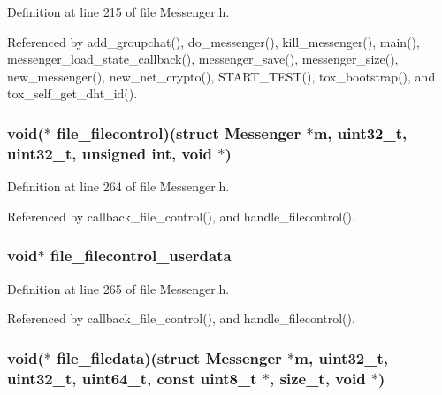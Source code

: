 Definition at line 215 of file Messenger.\+h.



Referenced by add\+\_\+groupchat(), do\+\_\+messenger(), kill\+\_\+messenger(), main(), messenger\+\_\+load\+\_\+state\+\_\+callback(), messenger\+\_\+save(), messenger\+\_\+size(), new\+\_\+messenger(), new\+\_\+net\+\_\+crypto(), S\+T\+A\+R\+T\+\_\+\+T\+E\+S\+T(), tox\+\_\+bootstrap(), and tox\+\_\+self\+\_\+get\+\_\+dht\+\_\+id().

\hypertarget{struct_messenger_a1e3990148af844c986e09a946650f7f3}{
\subsubsection[{file\+\_\+filecontrol}]{\setlength{\rightskip}{0pt plus 5cm}void($\ast$ file\+\_\+filecontrol)(struct {\bf Messenger} $\ast${\bf m}, uint32\+\_\+t, uint32\+\_\+t, unsigned int, void $\ast$)}}\label{struct_messenger_a1e3990148af844c986e09a946650f7f3}


Definition at line 264 of file Messenger.\+h.



Referenced by callback\+\_\+file\+\_\+control(), and handle\+\_\+filecontrol().

\hypertarget{struct_messenger_a34ba46a8cf11b02a23f7a7d219608c3b}{
\subsubsection[{file\+\_\+filecontrol\+\_\+userdata}]{\setlength{\rightskip}{0pt plus 5cm}void$\ast$ file\+\_\+filecontrol\+\_\+userdata}}\label{struct_messenger_a34ba46a8cf11b02a23f7a7d219608c3b}


Definition at line 265 of file Messenger.\+h.



Referenced by callback\+\_\+file\+\_\+control(), and handle\+\_\+filecontrol().

\hypertarget{struct_messenger_a2f2875b7bf0dda7ed90908d4e1139493}{
\subsubsection[{file\+\_\+filedata}]{\setlength{\rightskip}{0pt plus 5cm}void($\ast$ file\+\_\+filedata)(struct {\bf Messenger} $\ast${\bf m}, uint32\+\_\+t, uint32\+\_\+t, uint64\+\_\+t, const uint8\+\_\+t $\ast$, size\+\_\+t, void $\ast$)}}\label{struct_messenger_a2f2875b7bf0dda7ed90908d4e1139493}


